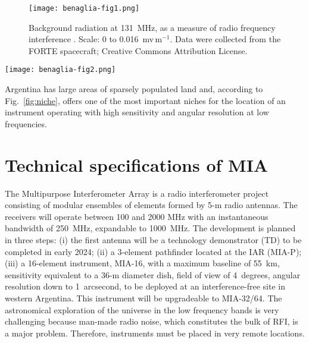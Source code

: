 \documentclass[baaa]{baaa}
\begin{document}
\begin{figure}[!h]
\centering
\texttt{[image: benaglia-fig1.png]}
\caption{Background radiation at 131~MHz, as a measure of radio frequency interference \citep[taken from][their Fig.~9]{haggerty2010}. Scale: 0 to 0.016~mv\,m$^{-1}$. Data were collected from the FORTE spacecraft; 
Creative Commons Attribution License. 
}
\label{fig:rfi131mhz}
\end{figure}

\begin{figure*}[t]
\centering
\texttt{[image: benaglia-fig2.png]}
\caption{Geolocalization of instruments  with (some) similar characteristics to MIA. CHIME: Canadian Hydrogen Intensity Mapping Experiment; DSA10/110: Deep Synoptic Array 10/110; LOFAR: Low Frequency Array; KAT7: Karoo Array Telescope; HERA: Hydrogen Epoch of Reionization Array; MeerKAT: `more of' KAT; FAST: Five-hundred meter aperture spherical radio telescope; MWA: Murchinson Widefield Array. Planisphere provided by the Instituto Geográfico Nacional, Ministerio de Defensa, Argentina; \url{www.ign.gob.ar/images/MapasWeb/PLANISFERIO/PLANISFERIO-2016.jpg}.  }
\label{fig:niche}
\end{figure*}

Argentina has large areas of sparsely populated land and, according to Fig.~\ref{fig:niche}, offers one of the most important niches for the location of an instrument operating with high sensitivity and angular resolution at low frequencies.

  
\section{Technical specifications of MIA}

The Multipurpose Interferometer Array is a radio interferometer project consisting of modular ensembles of elements formed by 5-m radio antennas. The receivers will operate between 100 and 2000 MHz with an instantaneous bandwidth of 250~MHz, expandable to 1000~MHz. The development is planned in three steps: (i) the first antenna will be a technology demonstrator (TD) to be completed in early 2024; (ii) a 3-element pathfinder located at the IAR (MIA-P); (iii) a 16-element instrument, MIA-16, with a maximum baseline of 55~km, sensitivity equivalent to a 36-m diameter dish, field of view of 4~degrees, angular resolution down to 1~arcsecond, to be deployed at an interference-free site in western Argentina. This instrument will be upgradeable to MIA-32/64. The astronomical exploration of the universe in the low frequency bands is very challenging because man-made radio noise, which constitutes the bulk of RFI, is a major problem. Therefore, instruments must be placed in very remote locations.
\end{document}
